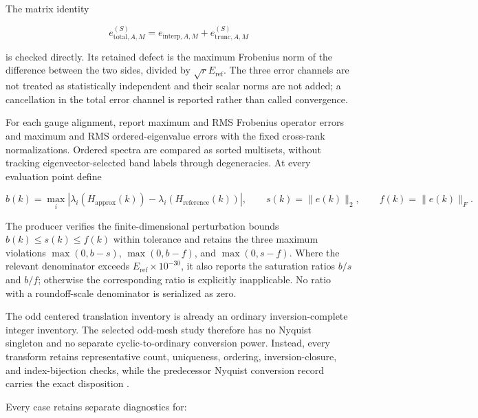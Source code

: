 \documentclass[11pt]{article}
\begin{document}
The matrix identity

\begin{equation}
 e_{\mathrm{total},A,M}^{(S)}
 =e_{\mathrm{interp},A,M}+e_{\mathrm{trunc},A,M}^{(S)}
 \label{eq:diagnostic-error-decomposition}
\end{equation}

is checked directly. Its retained defect is the maximum Frobenius norm of the difference
between the two sides, divided by $\sqrt rE_{\mathrm{ref}}$. The three error channels are
not treated as statistically independent and their scalar norms are not added; a
cancellation in the total error channel is reported rather than called convergence.

For each gauge alignment, report maximum and RMS Frobenius operator errors and maximum and RMS
ordered-eigenvalue errors with the fixed cross-rank normalizations. Ordered spectra are
compared as sorted multisets, without tracking eigenvector-selected band labels through
degeneracies. At every evaluation point define

\begin{equation}
 b(k)=\max_i\left|\lambda_i(H_{\mathrm{approx}}(k))
 -\lambda_i(H_{\mathrm{reference}}(k))\right|,
 \qquad
 s(k)=\lVert e(k)\rVert_2,
 \qquad
 f(k)=\lVert e(k)\rVert_F.
 \label{eq:diagnostic-perturbation-bounds}
\end{equation}

The producer verifies the finite-dimensional perturbation bounds
$b(k)\leq s(k)\leq f(k)$ within tolerance and retains the three maximum violations
$\max(0,b-s)$, $\max(0,b-f)$, and $\max(0,s-f)$. Where the relevant denominator exceeds
$E_{\mathrm{ref}}\times10^{-30}$, it also reports the
saturation ratios $b/s$ and $b/f$; otherwise the corresponding ratio is explicitly
inapplicable. No ratio with a roundoff-scale denominator is serialized as zero.

The odd centered translation inventory is already an ordinary inversion-complete integer
inventory. The selected odd-mesh study therefore has no Nyquist singleton and no separate cyclic-to-ordinary
conversion power. Instead, every transform retains representative count, uniqueness,
ordering, inversion-closure, and index-bijection checks, while the predecessor Nyquist
conversion record carries the exact disposition
.

Every case retains separate diagnostics for:
\end{document}

